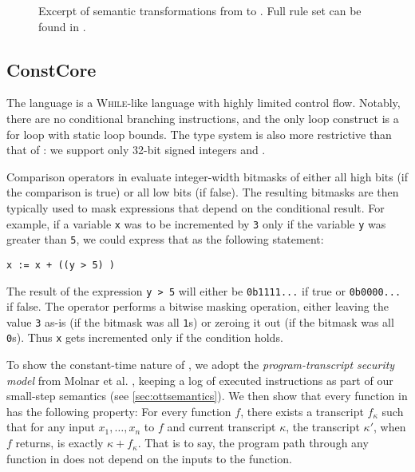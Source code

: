 \begin{figure*}[t]
\begin{druleparx}[Stt]
\end{druleparx}
        \caption{Excerpt of semantic transformations from \constc to \ccore. Full rule set can be found in .}
    \label{fig:transform}
\end{figure*}

\subsection{ConstCore}

The \ccore language is a \textsc{While}-like language \cite{ref:while} with highly limited
control flow. Notably, there are no conditional branching instructions, and the
only loop construct is a for loop with static loop bounds. The type system
is also more restrictive than that of \constc: we support only 32-bit
signed integers and \bytearrays.

Comparison operators in \ccore evaluate integer-width bitmasks of either all
high bits (if the comparison is true) or all low bits (if false). The resulting
bitmasks are then typically used to mask expressions that depend on the conditional
result. For example, if a variable \texttt{x} was to be incremented by \texttt{3}
only if the variable \texttt{y} was greater than \texttt{5}, we could express that
as the following statement:
\begin{center} \texttt{x := x + ((y > 5) )} \end{center}
The result of the expression \texttt{y > 5} will either be \texttt{0b1111...} if true
or \texttt{0b0000...} if false. The \band operator performs a bitwise masking operation,
either leaving the value \texttt{3} as-is (if the bitmask was all \texttt{1}s) or zeroing
it out (if the bitmask was all \texttt{0}s). Thus \texttt{x} gets incremented only
if the condition holds.

To show the constant-time nature of \ccore, we adopt the
\emph{program-transcript security model} from Molnar et al. \cite{molnar2005},
keeping a log of executed instructions as part of our small-step
semantics (see \autoref{sec:ottsemantics}). We then show that every function in
\ccore has the following property: For every function $f$, there exists a
transcript $f_\kappa$ such that for any input $x_1,\dots,x_n$ to $f$ and
current transcript $\kappa$, the transcript $\kappa'$, when $f$ returns, is
exactly $\kappa + f_\kappa$. That is to say, the program path through any
function in \ccore does not depend on the inputs to the function.

